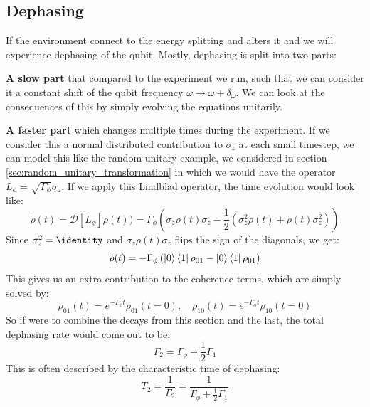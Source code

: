\subsection{Dephasing}\label{sec:theory_t2}
If the environment connect to the energy splitting and alters it and we will experience dephasing of the qubit. Mostly, dephasing is split into two parts: 

\textbf{A slow part} that compared to the experiment we run, such that we can consider it a constant shift of the qubit frequency $\omega \to \omega + \delta_\omega$. We can look at the consequences of this by simply evolving the equations unitarily. 


\textbf{A faster part} which changes multiple times during the experiment. If we consider this a normal distributed contribution to $\sigma_z$ at each small timestep, we can model this like the random unitary example, we considered in section \ref{sec:random_unitary_transformation} in which we would have the operator $L_\phi = \sqrt{\Gamma_\phi}\sigma_z$. If we apply this Lindblad operator, the time evolution would look like:
\begin{equation}
    \dot{\rho}(t) = \mathcal{D}[L_{\phi}]\rho(t)) = \Gamma_\phi\left(\sigma_z \rho(t) \sigma_z -\frac12( \sigma_z^2 \rho(t) + \rho(t) \sigma_z^2)\right)
\end{equation}
Since $\sigma_z^2 = \identity$ and $\sigma_z \rho(t) \sigma_z$ flips the sign of the diagonals, we get:
\begin{equation}
    \dot{\rho}(t) = - \Gamma_\phi \left(\ket{0}\bra{1}\rho_{01} - \ket{0}\bra{1}\rho_{01}\right)
\end{equation}
This gives us an extra contribution to the coherence terms, which are simply solved by:
\begin{equation}
    \rho_{01}(t) = e^{-\Gamma_\phi t}\rho_{01}(t=0), \quad \rho_{10}(t) = e^{-\Gamma_\phi t}\rho_{10}(t=0)
\end{equation}
So if were to combine the decays from this section and the last, the total dephasing rate would come out to be:
\begin{equation}
    \Gamma_2 = \Gamma_\phi + \frac12\Gamma_1 
\end{equation}
This is often described by the characteristic time of dephasing:
\begin{equation}\label{eq:t2_equation}
    T_2 = \frac{1}{\Gamma_2} = \frac{1}{\Gamma_\phi + \frac12\Gamma_1 } 
\end{equation}



